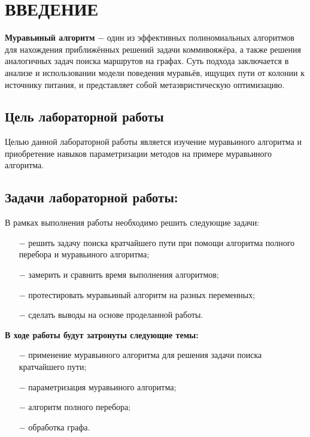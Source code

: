 \chapter*{ВВЕДЕНИЕ}

\textbf{Муравьиный алгоритм} $-$ один из эффективных полиномиальных алгоритмов для нахождения приближённых решений задачи коммивояжёра, а также решения аналогичных задач поиска маршрутов на графах. 
Суть подхода заключается в анализе и использовании модели поведения муравьёв, ищущих пути от колонии к источнику питания, и представляет собой метаэвристическую оптимизацию.
\section*{Цель лабораторной работы}
Целью данной лабораторной работы является изучение муравьиного алгоритма и приобретение навыков параметризации методов на примере муравьиного алгоритма.

\section*{Задачи лабораторной работы:}
В рамках выполнения работы необходимо решить следующие задачи:
	
\begin{itemize}
	\item[$-$] решить задачу поиска кратчайшего пути при помощи алгоритма полного перебора и муравьиного алгоритма;
	\item[$-$] замерить и сравнить время выполнения алгоритмов;
	\item[$-$] протестировать муравьиный алгоритм на разных переменных;
	\item[$-$] сделать выводы на основе проделанной работы.
\end{itemize}

\textbf{В ходе работы будут затронуты следующие темы:}


\begin{itemize}
	\item[$-$] применение муравьиного алгоритма для решения задачи поиска кратчайшего пути;
	\item[$-$] параметризация муравьиного алгоритма;
	\item[$-$] алгоритм полного перебора;
	\item[$-$] обработка графа.
\end{itemize}

